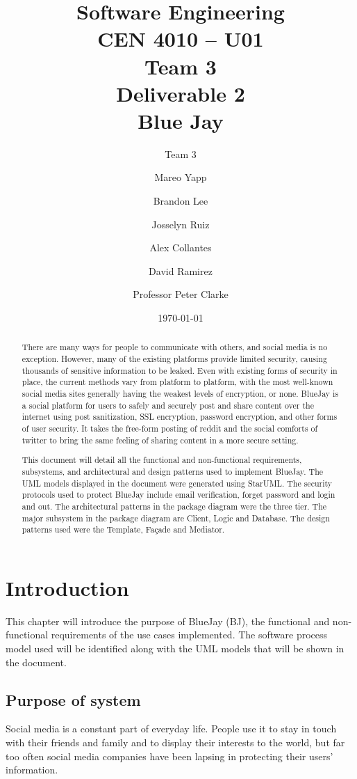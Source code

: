 \documentclass{report}
\begin{document}
\title{Software Engineering\\CEN 4010 – U01\\Team 3\\Deliverable 2\\Blue Jay}
\date{\today}
\author{Team 3\and Mareo Yapp\and Brandon Lee\and Josselyn Ruiz\and Alex Collantes\and David Ramirez\and Professor Peter Clarke}
\maketitle

\begin{abstract}
There are many ways for people to communicate with others,
and social media is no exception. However,
many of the existing platforms provide limited security,
causing thousands of sensitive information to be leaked.
Even with existing forms of security in place,
the current methods vary from platform to platform,
with the most well-known social media sites generally having the weakest levels of encryption, or none.
BlueJay is a social platform for users to safely and securely post and share content over the internet using post sanitization,
SSL encryption, password encryption, and other forms of user security.
It takes the free-form posting of reddit and the social comforts of twitter to bring the same feeling of sharing content in a more secure setting.

This document will detail all the functional and non-functional requirements,
subsystems, and architectural and design patterns used to implement BlueJay.
The UML models displayed in the document were generated using StarUML.
The security protocols used to protect BlueJay include email verification,
forget password and login and out.
The architectural patterns in the package diagram were the three tier.
The major subsystem in the package diagram are Client, Logic and Database.
The design patterns used were the Template, Façade and Mediator.
\end{abstract}
 
\tableofcontents

\chapter{Introduction}
	This chapter will introduce the purpose of BlueJay (BJ),
	the functional and non-functional requirements of the use cases implemented.
	The software process model used will be identified along with the UML models that will be shown in the document.
\section{Purpose of system}
	Social media is a constant part of everyday life.
	People use it to stay in touch with their friends and family and to display their interests to the world,
	but far too often social media companies have been lapsing in protecting their users’ information.
\end{document}
